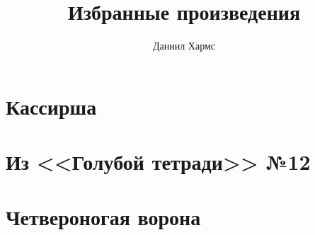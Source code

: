 \documentclass[12pt]{article}
\title{Избранные произведения}
\author{Даниил Хармс}
\date{}
\begin{document}
\maketitle

\section{Кассирша}

  			 
\section{Из <<Голубой тетради>> №12}


\section{Четвероногая ворона}

      
\end{document}

